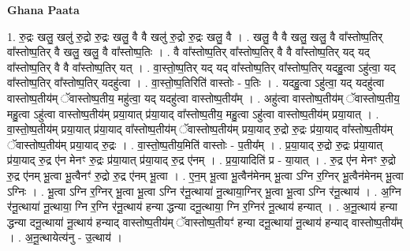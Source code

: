\documentclass[17pt]{extarticle}
\begin{document}
\textbf{Ghana Paata } \newline

1. रु॒द्रः खलु॒ खलु॑ रु॒द्रो रु॒द्रः खलु॒ वै वै खलु॑ रु॒द्रो रु॒द्रः खलु॒ वै । . खलु॒ वै वै खलु॒ खलु॒ वै वा᳚स्तोष्प॒तिर् वा᳚स्तोष्प॒तिर् वै खलु॒ खलु॒ वै वा᳚स्तोष्प॒तिः । . वै वा᳚स्तोष्प॒तिर् वा᳚स्तोष्प॒तिर् वै वै वा᳚स्तोष्प॒तिर् यद् यद् वा᳚स्तोष्प॒तिर् वै वै वा᳚स्तोष्प॒तिर् यत् । . वा॒स्तो॒ष्प॒तिर् यद् यद् वा᳚स्तोष्प॒तिर् वा᳚स्तोष्प॒तिर् यदहु॒त्वा ऽहु॑त्वा॒ यद् वा᳚स्तोष्प॒तिर् वा᳚स्तोष्प॒तिर् यदहु॑त्वा । . वा॒स्तो॒ष्प॒तिरिति॑ वास्तोः - प॒तिः । . यदहु॒त्वा ऽहु॑त्वा॒ यद् यदहु॑त्वा वास्तोष्प॒तीय॑म् ॅवास्तोष्प॒तीय॒ महु॑त्वा॒ यद् यदहु॑त्वा वास्तोष्प॒तीय᳚म् । . अहु॑त्वा वास्तोष्प॒तीय॑म् ॅवास्तोष्प॒तीय॒ महु॒त्वा ऽहु॑त्वा वास्तोष्प॒तीय॑म् प्रया॒यात् प्र॑या॒याद् वा᳚स्तोष्प॒तीय॒ महु॒त्वा ऽहु॑त्वा वास्तोष्प॒तीय॑म् प्रया॒यात् । . वा॒स्तो॒ष्प॒तीय॑म् प्रया॒यात् प्र॑या॒याद् वा᳚स्तोष्प॒तीय॑म् ॅवास्तोष्प॒तीय॑म् प्रया॒याद् रु॒द्रो रु॒द्रः प्र॑या॒याद् वा᳚स्तोष्प॒तीय॑म् ॅवास्तोष्प॒तीय॑म् प्रया॒याद् रु॒द्रः । . वा॒स्तो॒ष्प॒तीय॒मिति॑ वास्तोः - प॒तीय᳚म् । . प्र॒या॒याद् रु॒द्रो रु॒द्रः प्र॑या॒यात् प्र॑या॒याद् रु॒द्र ए॑न मेनꣳ रु॒द्रः प्र॑या॒यात् प्र॑या॒याद् रु॒द्र ए॑नम् । . प्र॒या॒यादिति॑ प्र - या॒यात् । . रु॒द्र ए॑न मेनꣳ रु॒द्रो रु॒द्र ए॑नम् भू॒त्वा भू॒त्वैनꣳ॑ रु॒द्रो रु॒द्र ए॑नम् भू॒त्वा । . ए॒न॒म् भू॒त्वा भू॒त्वैन॑मेनम् भू॒त्वा ऽग्नि र॒ग्निर् भू॒त्वैन॑मेनम् भू॒त्वा ऽग्निः । . भू॒त्वा ऽग्नि र॒ग्निर् भू॒त्वा भू॒त्वा ऽग्नि र॑नू॒त्थाया॑ नू॒त्थाया॒ग्निर् भू॒त्वा भू॒त्वा ऽग्नि र॑नू॒त्थाय॑ । . अ॒ग्नि र॑नू॒त्थाया॑ नू॒त्थाया॒ ग्नि र॒ग्नि र॑नू॒त्थाय॑ हन्या द्धन्या दनू॒त्थाया॒ ग्नि र॒ग्निर॑ नू॒त्थाय॑ हन्यात् । . अ॒नू॒त्थाय॑ हन्या द्धन्या दनू॒त्थाया॑ नू॒त्थाय॑ हन्याद् वास्तोष्प॒तीय॑म् ॅवास्तोष्प॒तीयꣳ॑ हन्या दनू॒त्थाया॑ नू॒त्थाय॑ हन्याद् वास्तोष्प॒तीय᳚म् । . अ॒नू॒त्थायेत्य॑नु - उ॒त्थाय॑ । \newline
\end{document}
